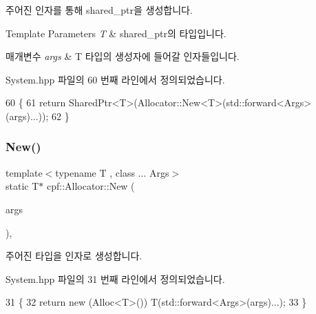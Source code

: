 주어진 인자를 통해 shared\+\_\+ptr을 생성합니다.


\begin{DoxyTemplParams}{Template Parameters}
{\em T} & shared\+\_\+ptr의 타입입니다. \\
\hline
\end{DoxyTemplParams}

\begin{DoxyParams}{매개변수}
{\em args} & T 타입의 생성자에 들어갈 인자들입니다. \\
\hline
\end{DoxyParams}


System.\+hpp 파일의 60 번째 라인에서 정의되었습니다.


\begin{DoxyCode}
60                                                            \{
61             \textcolor{keywordflow}{return} SharedPtr<T>(Allocator::New<T>(std::forward<Args>(args)...));
62         \}
\end{DoxyCode}
\mbox{\label{classcpf_1_1_allocator_ab224979f67fae21e9db39b211a67b2e9}} 
\subsubsection{\texorpdfstring{New()}{New()}}
{\footnotesize\ttfamily template$<$typename T , class ... Args$>$ \\
static T$\ast$ cpf\+::\+Allocator\+::\+New (\begin{DoxyParamCaption}\item[{Args \&\&...}]{args }\end{DoxyParamCaption})\hspace{0.3cm}{\ttfamily [inline]}, {\ttfamily [static]}}

주어진 타입을 인자로 생성합니다. 

System.\+hpp 파일의 31 번째 라인에서 정의되었습니다.


\begin{DoxyCode}
31                                        \{
32             \textcolor{keywordflow}{return} \textcolor{keyword}{new} (Alloc<T>()) T(std::forward<Args>(args)...);
33         \}
\end{DoxyCode}
\mbox{\label{classcpf_1_1_allocator_a60701a3cdd64b6feb7d0b1643200b412}} 
